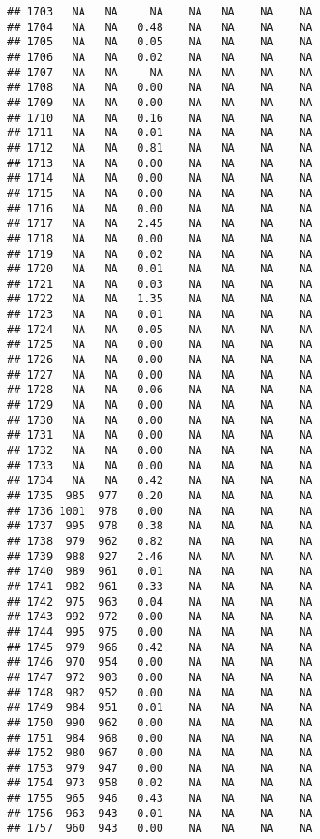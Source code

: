 \documentclass{article}\usepackage{graphicx, color}
\makeatletter
\newenvironment{kframe}{%
 \def\at@end@of@kframe{}%
 \ifinner\ifhmode%
  \def\at@end@of@kframe{\end{minipage}}%
  \begin{minipage}{\columnwidth}%
 \fi\fi%
 \def\FrameCommand##1{\hskip\@totalleftmargin \hskip-\fboxsep
 \colorbox{shadecolor}{##1}\hskip-\fboxsep
     \hskip-\linewidth \hskip-\@totalleftmargin \hskip\columnwidth}%
 \MakeFramed {\advance\hsize-\width
   \@totalleftmargin\z@ \linewidth\hsize
   \@setminipage}}%
 {\par\unskip\endMakeFramed%
 \at@end@of@kframe}
\newenvironment{knitrout}{}{} %
\makeatother
\begin{document}
\begin{knitrout}
\begin{kframe}
\begin{verbatim}
## 1703   NA   NA     NA    NA   NA    NA    NA
## 1704   NA   NA   0.48    NA   NA    NA    NA
## 1705   NA   NA   0.05    NA   NA    NA    NA
## 1706   NA   NA   0.02    NA   NA    NA    NA
## 1707   NA   NA     NA    NA   NA    NA    NA
## 1708   NA   NA   0.00    NA   NA    NA    NA
## 1709   NA   NA   0.00    NA   NA    NA    NA
## 1710   NA   NA   0.16    NA   NA    NA    NA
## 1711   NA   NA   0.01    NA   NA    NA    NA
## 1712   NA   NA   0.81    NA   NA    NA    NA
## 1713   NA   NA   0.00    NA   NA    NA    NA
## 1714   NA   NA   0.00    NA   NA    NA    NA
## 1715   NA   NA   0.00    NA   NA    NA    NA
## 1716   NA   NA   0.00    NA   NA    NA    NA
## 1717   NA   NA   2.45    NA   NA    NA    NA
## 1718   NA   NA   0.00    NA   NA    NA    NA
## 1719   NA   NA   0.02    NA   NA    NA    NA
## 1720   NA   NA   0.01    NA   NA    NA    NA
## 1721   NA   NA   0.03    NA   NA    NA    NA
## 1722   NA   NA   1.35    NA   NA    NA    NA
## 1723   NA   NA   0.01    NA   NA    NA    NA
## 1724   NA   NA   0.05    NA   NA    NA    NA
## 1725   NA   NA   0.00    NA   NA    NA    NA
## 1726   NA   NA   0.00    NA   NA    NA    NA
## 1727   NA   NA   0.00    NA   NA    NA    NA
## 1728   NA   NA   0.06    NA   NA    NA    NA
## 1729   NA   NA   0.00    NA   NA    NA    NA
## 1730   NA   NA   0.00    NA   NA    NA    NA
## 1731   NA   NA   0.00    NA   NA    NA    NA
## 1732   NA   NA   0.00    NA   NA    NA    NA
## 1733   NA   NA   0.00    NA   NA    NA    NA
## 1734   NA   NA   0.42    NA   NA    NA    NA
## 1735  985  977   0.20    NA   NA    NA    NA
## 1736 1001  978   0.00    NA   NA    NA    NA
## 1737  995  978   0.38    NA   NA    NA    NA
## 1738  979  962   0.82    NA   NA    NA    NA
## 1739  988  927   2.46    NA   NA    NA    NA
## 1740  989  961   0.01    NA   NA    NA    NA
## 1741  982  961   0.33    NA   NA    NA    NA
## 1742  975  963   0.04    NA   NA    NA    NA
## 1743  992  972   0.00    NA   NA    NA    NA
## 1744  995  975   0.00    NA   NA    NA    NA
## 1745  979  966   0.42    NA   NA    NA    NA
## 1746  970  954   0.00    NA   NA    NA    NA
## 1747  972  903   0.00    NA   NA    NA    NA
## 1748  982  952   0.00    NA   NA    NA    NA
## 1749  984  951   0.01    NA   NA    NA    NA
## 1750  990  962   0.00    NA   NA    NA    NA
## 1751  984  968   0.00    NA   NA    NA    NA
## 1752  980  967   0.00    NA   NA    NA    NA
## 1753  979  947   0.00    NA   NA    NA    NA
## 1754  973  958   0.02    NA   NA    NA    NA
## 1755  965  946   0.43    NA   NA    NA    NA
## 1756  963  943   0.01    NA   NA    NA    NA
## 1757  960  943   0.00    NA   NA    NA    NA

\end{verbatim}
\end{kframe}
\end{knitrout}
\end{document}
